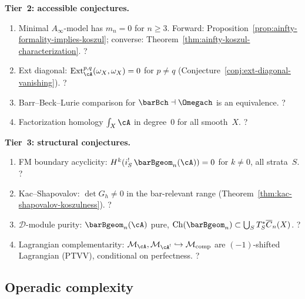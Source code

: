 \medskip\noindent
\textbf{Tier~2: accessible conjectures.}

\begin{enumerate}[label=\textup{(\roman*)},ref=\roman*,resume]
\item\label{item:kp-ainfty}
  Minimal $A_\infty$-model has $m_n = 0$ for $n \ge 3$.
  Forward: Proposition~\ref{prop:ainfty-formality-implies-koszul};
  converse: Theorem~\ref{thm:ainfty-koszul-characterization}.
  \hfill ?
\item\label{item:kp-ext}
  Ext diagonal: $\operatorname{Ext}^{p,q}_\cA(\omega_X,\omega_X)=0$ for $p \neq q$
  (Conjecture~\ref{conj:ext-diagonal-vanishing}).
  \hfill ?
\item\label{item:kp-barrbeck}
  Barr--Beck--Lurie comparison for $\barBch \dashv \Omegach$ is an equivalence.
  \hfill ?
\item\label{item:kp-facthom}
  Factorization homology $\textstyle\int_X \cA$ in degree~$0$ for all smooth~$X$.
  \hfill ?
\end{enumerate}

\medskip\noindent
\textbf{Tier~3: structural conjectures.}

\begin{enumerate}[label=\textup{(\roman*)},ref=\roman*,resume]
\item\label{item:kp-fmbdy}
  FM boundary acyclicity: $H^k(i_S^!\,\barBgeom_n(\cA)) = 0$ for $k \neq 0$, all strata~$S$.
  \hfill ?
\item\label{item:kp-nullvec}
  Kac--Shapovalov: $\det G_h \neq 0$ in the bar-relevant range
  (Theorem~\ref{thm:kac-shapovalov-koszulness}).
  \hfill ?
\item\label{item:kp-dmod}
  $\mathcal{D}$-module purity: $\barBgeom_n(\cA)$ pure, $\operatorname{Ch}(\barBgeom_n) \subset \bigcup_S T^*_S\overline{C}_n(X)$.
  \hfill ?
\item\label{item:kp-lagrangian}
  Lagrangian complementarity: $\mathcal{M}_\cA, \mathcal{M}_{\cA^!} \hookrightarrow \mathcal{M}_{\mathrm{comp}}$ are $(-1)$-shifted Lagrangian (PTVV), conditional on perfectness.
  \hfill ?
\end{enumerate}


\subsection{Operadic complexity}
\label{subsec:concordance-operadic-complexity}

